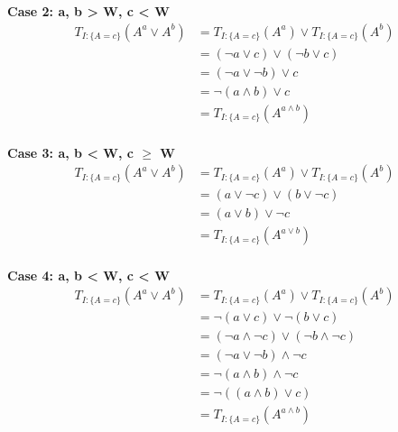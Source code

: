 \documentclass[part1.tex]{subfiles}
\begin{document}
{\bfseries Case 2: a, b > W, c < W}
\begin{align*}
        T_{I:\{A = c\}}(A^{a} \vee A^{b}) 
                 &= T_{I:\{A = c\}}(A^{a}) \vee T_{I:\{A = c\}}(A^{b}) \\
                 &= (\neg{a} \vee c) \vee (\neg{b} \vee c) \\
                 &= (\neg{a} \vee \neg{b}) \vee c \\
                 &= \neg{(a \wedge b)} \vee c \\
                 &= T_{I:\{A = c\}}(A^{a \wedge b}) \\
\end{align*}

{\bfseries Case 3: a, b < W, c $\ge$ W}
\begin{align*}
        T_{I:\{A = c\}}(A^{a} \vee A^{b}) 
                 &= T_{I:\{A = c\}}(A^{a}) \vee T_{I:\{A = c\}}(A^{b}) \\
                 &= (a \vee \neg{c}) \vee (b \vee \neg{c}) \\
                 &= (a \vee b) \vee \neg{c} \\
                 &= T_{I:\{A = c\}}(A^{a \vee b}) \\
\end{align*}

{\bfseries Case 4: a, b < W, c < W}
\begin{align*}
        T_{I:\{A = c\}}(A^{a} \vee A^{b}) 
                 &= T_{I:\{A = c\}}(A^{a}) \vee T_{I:\{A = c\}}(A^{b}) \\
                 &= \neg{(a \vee c)} \vee \neg{(b \vee c)} \\
                 &= (\neg{a} \wedge \neg{c}) \vee (\neg{b} \wedge \neg{c})\\
                 &= (\neg{a} \vee \neg{b}) \wedge \neg{c}\\
                 &= \neg{(a \wedge b)} \wedge \neg{c}\\
                 &= \neg{((a \wedge b) \vee c)}\\
                 &= T_{I:\{A = c\}}(A^{a \wedge b}) \\
\end{align*}
\end{document}
